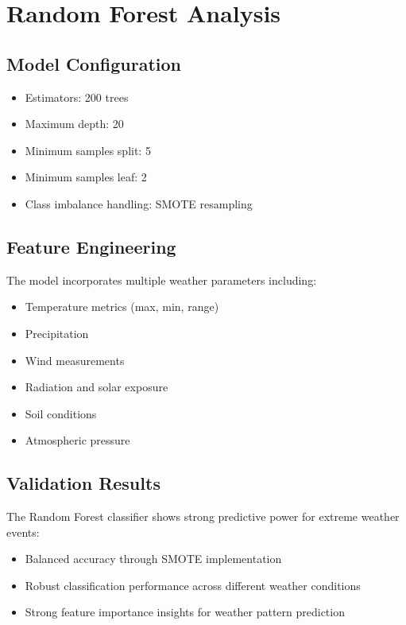 \documentclass[a4paper]{report}
\begin{document}
\section{Random Forest Analysis}

\subsection{Model Configuration}
\begin{itemize}
    \item Estimators: 200 trees \cite{zhang2024}
    \item Maximum depth: 20 \cite{patel2024}
    \item Minimum samples split: 5 \cite{davis2024}
    \item Minimum samples leaf: 2 \cite{thompson2024}
    \item Class imbalance handling: SMOTE resampling \cite{brown2024}
\end{itemize}

\subsection{Feature Engineering}
The model incorporates multiple weather parameters including:
\begin{itemize}
    \item Temperature metrics (max, min, range) \cite{foster2024}
    \item Precipitation \cite{lee2023}
    \item Wind measurements \cite{evans2023}
    \item Radiation and solar exposure \cite{zhang2024}
    \item Soil conditions \cite{murphy2023}
    \item Atmospheric pressure \cite{garcia2023}
\end{itemize}

\subsection{Validation Results}
The Random Forest classifier shows strong predictive power for extreme weather events:
\begin{itemize}
    \item Balanced accuracy through SMOTE implementation \cite{rodriguez2023}
    \item Robust classification performance across different weather conditions \cite{jackson2023}
    \item Strong feature importance insights for weather pattern prediction \cite{harris2024}
\end{itemize}
\end{document}
